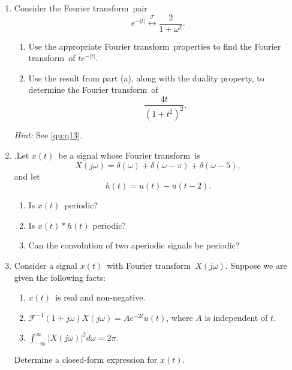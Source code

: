 \documentclass[11pt]{article}
\newcommand\ft{Fourier transform}
\newcommand\xt{$x(t)$}
\newcommand\xo{$X(j\omega)$}
\begin{document}
\begin{enumerate}
    \item Consider the \ft~pair
    \begin{equation*}
        e^{-|t|} \overset{\mathcal{F}}{\longleftrightarrow} \frac{2}{1+\omega^2}.
    \end{equation*}
    \begin{enumerate}
        \item Use the appropriate \ft~properties to find the \ft~of $te^{-|t|}$.
        \item Use the result from part (a), along with the duality property, to determine the \ft~of
        \begin{equation*}
          \frac{4t}{(1+t^2)^2}.
        \end{equation*}
    \end{enumerate}
    \emph{Hint:} See \ref{qu:q13}.

    \item \label{qu:q13}.Let \xt~be a signal whose \ft~is
    \begin{equation*}
        X(j\omega) =\delta(\omega)+\delta(\omega -\pi) + \delta(\omega-5),
    \end{equation*}
    and let
    \begin{equation*}
        h(t) = u(t) - u(t-2).
    \end{equation*}
    \begin{enumerate}
        \item Is \xt~periodic?
        \item Is $x(t)\ast h(t)$ periodic?
        \item Can the convolution of two aperiodic signals be periodic?
    \end{enumerate}

    \item  Consider a signal \xt~with \ft~\xo. Suppose we are given the following facts:
    \begin{enumerate}
        \item \xt~is real and non-negative.
        \item $\mathcal{F}^{-1}{(1+j\omega)X(j\omega)} = Ae^{-2t}u(t)$, where $A$ is independent of $t$.
        \item $\int_{-\infty}^{\infty}|X(j\omega)|^2d\omega = 2\pi$.
    \end{enumerate}
    Determine a closed-form expression for \xt.


\end{enumerate}
\end{document}
